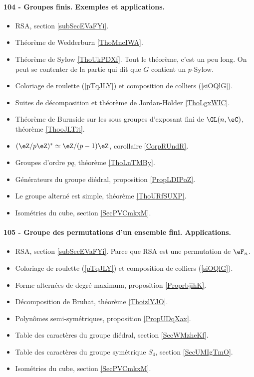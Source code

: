 \paragraph{104 - Groupes finis. Exemples et applications.}
\begin{itemize}
    \item RSA, section \ref{subSecEVaFYi}.
    \item Théorème de Wedderburn \ref{ThoMncIWA}.
    \item Théorème de Sylow \ref{ThoUkPDXf}. Tout le théorème, c'est un peu long. On peut se contenter de la partie qui dit que \( G\) contient un \( p\)-Sylow.
    \item Coloriage de roulette (\ref{pTqJLY}) et composition de colliers (\ref{siOQlG}).
    \item Suites de décomposition et théorème de Jordan-Hölder \ref{ThoLgxWIC}.
    \item Théorème de Burnside sur les sous groupes d'exposant fini de \( \GL(n,\eC)\), théorème \ref{ThooJLTit}.
    \item \( (\eZ/p\eZ)^*\simeq \eZ/(p-1)\eZ\), corollaire \ref{CorpRUndR}.
    \item Groupes d'ordre \( pq\), théorème \ref{ThoLnTMBy}.
    \item Générateurs du groupe diédral, proposition \ref{PropLDIPoZ}.
    \item Le groupe alterné est simple, théorème \ref{ThoURfSUXP}.
    \item Isométries du cube, section \ref{SecPVCmkxM}.
\end{itemize}

\paragraph{105 - Groupe des permutations d’un ensemble fini. Applications.}
\begin{itemize}
    \item RSA, section \ref{subSecEVaFYi}. Parce que RSA est une permutation de \( \eF_n\).
    \item Coloriage de roulette (\ref{pTqJLY}) et composition de colliers (\ref{siOQlG}).
    \item Forme alternées de degré maximum, proposition \ref{ProprbjihK}.
    \item Décomposition de Bruhat, théorème \ref{ThoizlYJO}.
    \item Polynômes semi-symétriques, proposition \ref{PropUDqXax}.
    \item Table des caractères du groupe diédral, section \ref{SecWMzheKf}.
    \item Table des caractères du groupe symétrique \( S_4\), section \ref{SecUMIgTmO}.
    \item Isométries du cube, section \ref{SecPVCmkxM}.
\end{itemize}

